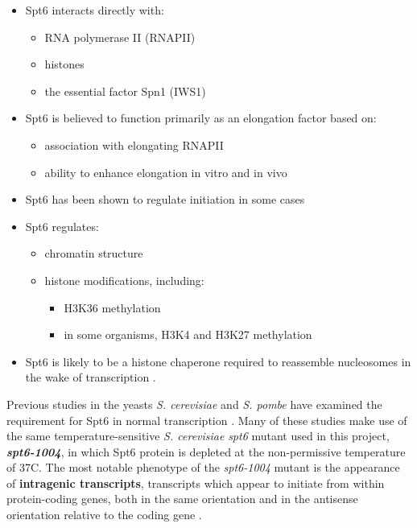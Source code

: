 \documentclass[11pt, a4paper]{article}
\begin{document}
\begin{itemize}[nosep, topsep=.5em]
\item Spt6 interacts directly with:
	\begin{itemize}[nosep]
	\item RNA polymerase II (RNAPII) \cite{close2011, diebold2011, liu2011, sdano2017, sun2010, yoh2007}
	\item histones \cite{bortvin1996, mccullough2015}
	\item the essential factor Spn1 (IWS1) \cite{diebold2010b, li2018, mcdonald2010}
	\end{itemize}
\item Spt6 is believed to function primarily as an elongation factor based on:
	\begin{itemize}[nosep]
	\item association with elongating RNAPII \cite{andrulis2000, ivanovska2011, kaplan2000, mayer2010}
	\item ability to enhance elongation in vitro \cite{endoh2004} and in vivo \cite{ardehali2009}
	\end{itemize}
\item Spt6 has been shown to regulate initiation in some cases \cite{adkins2006, ivanovska2011}
\item Spt6 regulates:
	\begin{itemize}[nosep]
	\item chromatin structure \cite{bortvin1996, degennaro2013, ivanovska2011, jeronimo2015, kaplan2003, perales2013, vanbakel2013}
	\item histone modifications, including:
		\begin{itemize}[nosep]
		\item H3K36 methylation \cite{carrozza2005, chu2006, yoh2008, youdell2008}
		\item in some organisms, H3K4 and H3K27 methylation \cite{begum2012, chen2012, degennaro2013, wang2017, wang2013}
		\end{itemize}
	\end{itemize}
\item Spt6 is likely to be a histone chaperone required to reassemble nucleosomes in the wake of transcription \cite{duina2011}.
\end{itemize}

Previous studies in the yeasts \textit{S. cerevisiae} and \textit{S. pombe} have examined the requirement for Spt6 in normal transcription \cite{cheung2008, degennaro2013, kaplan2003, pathak2018, uwimana2017, vanbakel2013}. Many of these studies make use of the same temperature-sensitive \textit{S. cerevisiae} \textit{spt6} mutant used in this project, \textbf{\textit{spt6-1004}}, in which Spt6 protein is depleted at the non-permissive temperature of 37\textdegree C. The most notable phenotype of the \textit{spt6-1004} mutant is the appearance of \textbf{intragenic transcripts}, transcripts which appear to initiate from within protein-coding genes, both in the same orientation and in the antisense orientation relative to the coding gene \cite{cheung2008, degennaro2013, kaplan2003, uwimana2017}.
\end{document}
